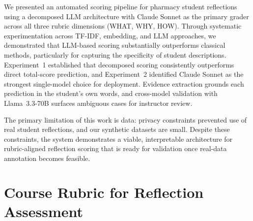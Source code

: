 \documentclass[11pt]{article}
\begin{document}
We presented an automated scoring pipeline for pharmacy student reflections using a decomposed LLM architecture with Claude Sonnet as the primary grader across all three rubric dimensions (WHAT, WHY, HOW). Through systematic experimentation across TF-IDF, embedding, and LLM approaches, we demonstrated that LLM-based scoring substantially outperforms classical methods, particularly for capturing the specificity of student descriptions. Experiment~1 established that decomposed scoring consistently outperforms direct total-score prediction, and Experiment~2 identified Claude Sonnet as the strongest single-model choice for deployment. Evidence extraction grounds each prediction in the student's own words, and cross-model validation with Llama~3.3-70B surfaces ambiguous cases for instructor review.

The primary limitation of this work is data: privacy constraints prevented use of real student reflections, and our synthetic datasets are small. Despite these constraints, the system demonstrates a viable, interpretable architecture for rubric-aligned reflection scoring that is ready for validation once real-data annotation becomes feasible.






\appendix
\section{Course Rubric for Reflection Assessment}
\label{app:rubric}
\end{document}
